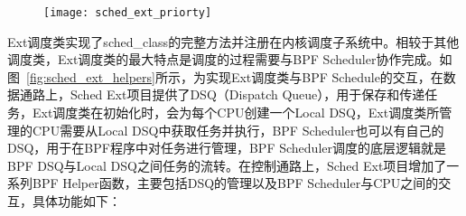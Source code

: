 \begin{figure}[!htbp]
    \centering
    \texttt{[image: sched\_ext\_priorty]}
    \label{fig:sched_ext_priorty}
\end{figure}

Ext调度类实现了sched\_class的完整方法并注册在内核调度子系统中。相较于其他调度类，Ext调度类的最大特点是调度的过程需要与BPF Scheduler协作完成。如图~\ref{fig:sched_ext_helpers}所示，为实现Ext调度类与BPF Schedule的交互，在数据通路上，Sched Ext项目提供了DSQ（Dispatch Queue），用于保存和传递任务，Ext调度类在初始化时，会为每个CPU创建一个Local DSQ，Ext调度类所管理的CPU需要从Local DSQ中获取任务并执行，BPF Scheduler也可以有自己的DSQ，用于在BPF程序中对任务进行管理，BPF Scheduler调度的底层逻辑就是BPF DSQ与Local DSQ之间任务的流转。在控制通路上，Sched Ext项目增加了一系列BPF Helper函数，主要包括DSQ的管理以及BPF Scheduler与CPU之间的交互，具体功能如下：

